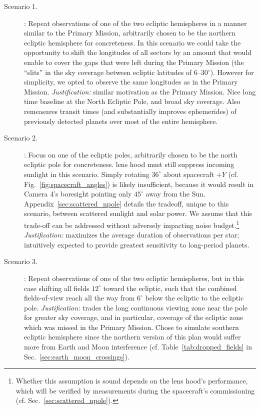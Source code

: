 \begin{description}

\item[Scenario 1.] \nhemi: Repeat observations of one of the two
  ecliptic hemispheres in a manner similar to the Primary Mission,
  arbitrarily chosen to be the northern ecliptic hemisphere for
  concreteness. In this scenario we could take the opportunity to 
  shift the longitudes of all sectors by an amount that would enable 
  \tess to cover the gaps that were left during the Primary Mission 
  (the ``slits'' in the sky coverage between ecliptic latitudes of 
  6--30$^\circ$).
  However for simplicity, we opted to observe the same longitudes as
  in the Primary Mission.
  \textit{Justification:} similar motivation as the Primary Mission.
  Nice long time baseline at the North Ecliptic Pole, and broad sky
  coverage. Also remeasures transit times (and substantially improves 
  ephemerides)
  of previously detected \tess planets over most of the entire
  hemisphere.

\item[Scenario 2.] \npole: Focus on one of the ecliptic poles,
	arbitrarily chosen to be the north ecliptic pole for
	concreteness. \tesss lens hood must still
	suppress incoming sunlight in this scenario.
	Simply rotating $36^\circ$ about spacecraft $+Y$ (cf. 
	Fig.~\ref{fig:spacecraft_angles}) is likely insufficient, because
	it would result in Camera 4's boresight pointing only $45^\circ$
	away from the Sun. Appendix~\ref{sec:scattered_npole} details the
	tradeoff, unique to this scenario, between scattered sunlight and solar 
	power.
	We assume that this trade-off can be addressed without adversely
	impacting \tesss noise budget.\footnote{Whether this 
		assumption is sound depends on the lens hood's performance,
		which will be verified by measurements during the spacecraft's 
		commissioning (cf. Sec.~\ref{sec:scattered_npole}).}
	\textit{Justification:} maximizes the average duration of
	observations per star; intuitively expected to provide
	greatest sensitivity to long-period planets.

\item[Scenario 3.] \shemiAvoid: Repeat observations of one of the two
  ecliptic hemispheres, but in this case shifting all fields $12^\circ$
  toward the ecliptic, such that the combined fields-of-view reach all
  the way from $6^\circ$ below the ecliptic to the ecliptic pole.
  \textit{Justification:} trades the long continuous viewing zone near
  the pole for greater sky coverage, and in particular, coverage of
  the ecliptic zone which was missed in the Primary Mission.  Chose
  to simulate southern ecliptic hemisphere since the northern
  version of this plan would suffer more from Earth and Moon interference
  (cf. Table~\ref{tab:dropped_fields} in
  Sec.~\ref{sec:earth_moon_crossings}).
  

\end{description}
